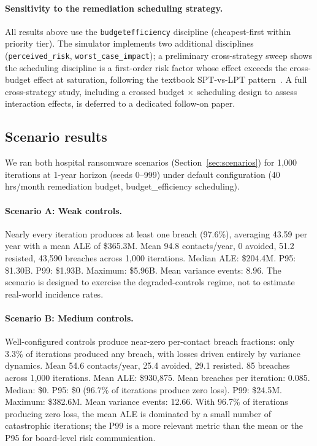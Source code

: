 \documentclass[11pt,a4paper]{article}
\DeclareRobustCommand{\code}[1]{%
  \begingroup
  \def\_{\textunderscore\allowbreak}%
  \texttt{#1}%
  \endgroup}
\begin{document}
\paragraph{Sensitivity to the remediation scheduling strategy.} All results above use the \code{budget\_efficiency} discipline (cheapest-first within priority tier). The simulator implements two additional disciplines (\texttt{perceived\_risk}, \texttt{worst\_case\_impact}); a preliminary cross-strategy sweep shows the scheduling discipline is a first-order risk factor whose effect exceeds the cross-budget effect at saturation, following the textbook SPT-vs-LPT pattern~\citep{Kleinrock1975}. A full cross-strategy study, including a crossed budget $\times$ scheduling design to assess interaction effects, is deferred to a dedicated follow-on paper.

\subsection{Scenario results}
\label{sec:scenario-results}

We ran both hospital ransomware scenarios (Section~\ref{sec:scenarios}) for 1{,}000 iterations at 1-year horizon (seeds 0--999) under default configuration (40 hrs/month remediation budget, budget\_efficiency scheduling).

\paragraph{Scenario A: Weak controls.} Nearly every iteration produces at least one breach (97.6\%), averaging 43.59 per year with a mean ALE of \$365.3M. Mean 94.8 contacts/year, 0 avoided, 51.2 resisted, 43{,}590 breaches across 1{,}000 iterations. Median ALE: \$204.4M. P95: \$1.30B. P99: \$1.93B. Maximum: \$5.96B. Mean variance events: 8.96. The scenario is designed to exercise the degraded-controls regime, not to estimate real-world incidence rates.

\paragraph{Scenario B: Medium controls.} Well-configured controls produce near-zero per-contact breach fractions: only 3.3\% of iterations produced any breach, with losses driven entirely by variance dynamics. Mean 54.6 contacts/year, 25.4 avoided, 29.1 resisted. 85 breaches across 1{,}000 iterations. Mean ALE: \$930{,}875. Mean breaches per iteration: 0.085. Median: \$0. P95: \$0 (96.7\% of iterations produce zero loss). P99: \$24.5M. Maximum: \$382.6M. Mean variance events: 12.66. With 96.7\% of iterations producing zero loss, the mean ALE is dominated by a small number of catastrophic iterations; the P99 is a more relevant metric than the mean or the P95 for board-level risk communication.
\end{document}
